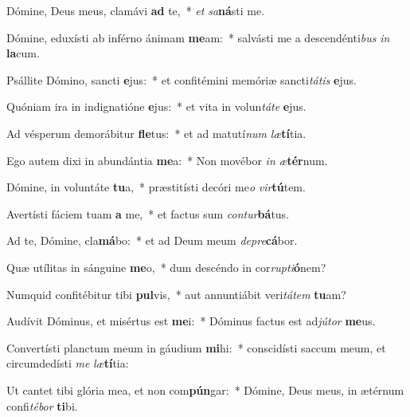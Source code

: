 \item Dómine, Deus meus, clamávi \textbf{ad} te,~* \textit{et} \textit{sa}\textbf{ná}sti me.
\item Dómine, eduxísti ab inférno ánimam \textbf{me}am:~* salvásti me a descendénti\textit{bus} \textit{in} \textbf{la}cum.
\item Psállite Dómino, sancti \textbf{e}jus:~* et confitémini memóriæ sancti\textit{tátis} \textbf{e}jus.
\item Quóniam ira in indignatióne \textbf{e}jus:~* et vita in volun\textit{táte} \textbf{e}jus.
\item Ad vésperum demorábitur \textbf{fle}tus:~* et ad matutí\textit{num} \textit{læ}\textbf{tí}tia.
\item Ego autem dixi in abundántia \textbf{me}a:~* Non movébor \textit{in} \textit{æ}\textbf{tér}num.
\item Dómine, in voluntáte \textbf{tu}a,~* præstitísti decóri me\textit{o} \textit{vir}\textbf{tú}tem.
\item Avertísti fáciem tuam \textbf{a} me,~* et factus sum \textit{contur}\textbf{bá}tus.
\item Ad te, Dómine, cla\textbf{má}bo:~* et ad Deum meum \textit{depre}\textbf{cá}bor.
\item Quæ utílitas in sánguine \textbf{me}o,~* dum descéndo in cor\textit{rupti}\textbf{ó}nem?
\item Numquid confitébitur tibi \textbf{pul}vis,~* aut annuntiábit veri\textit{tátem} \textbf{tu}am?
\item Audívit Dóminus, et misértus est \textbf{me}i:~* Dóminus factus est ad\textit{jútor} \textbf{me}us.
\item Convertísti planctum meum in gáudium \textbf{mi}hi:~* conscidísti saccum meum, et circumdedísti \textit{me} \textit{læ}\textbf{tí}tia:
\item Ut cantet tibi glória mea, et non com\textbf{pún}gar:~* Dómine, Deus meus, in ætérnum confi\tinyhspace\textit{tébor} \textbf{ti}bi.
